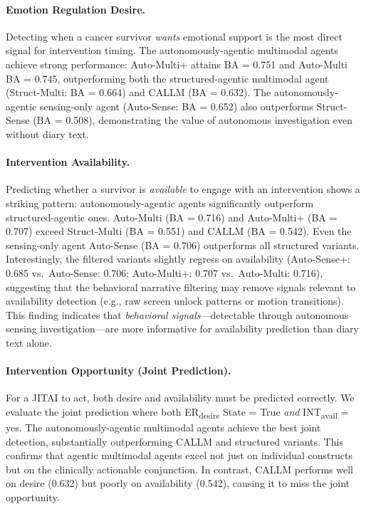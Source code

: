 \documentclass[screen,review,anonymous]{acmart}
\newcommand{\erdesire}{ER\textsubscript{desire}}
\newcommand{\intavail}{INT\textsubscript{avail}}
\begin{document}


\paragraph{Emotion Regulation Desire.}
Detecting when a cancer survivor \emph{wants} emotional support is the most direct signal for intervention timing. The autonomously-agentic multimodal agents achieve strong performance: Auto-Multi+ attains BA = 0.751 and Auto-Multi BA = 0.745, outperforming both the structured-agentic multimodal agent (Struct-Multi: BA = 0.664) and CALLM (BA = 0.632). The autonomously-agentic sensing-only agent (Auto-Sense: BA = 0.652) also outperforms Struct-Sense (BA = 0.508), demonstrating the value of autonomous investigation even without diary text.

\paragraph{Intervention Availability.}
Predicting whether a survivor is \emph{available} to engage with an intervention shows a striking pattern: autonomously-agentic agents significantly outperform structured-agentic ones. Auto-Multi (BA = 0.716) and Auto-Multi+ (BA = 0.707) exceed Struct-Multi (BA = 0.551) and CALLM (BA = 0.542). Even the sensing-only agent Auto-Sense (BA = 0.706) outperforms all structured variants. Interestingly, the filtered variants slightly regress on availability (Auto-Sense+: 0.685 vs.\ Auto-Sense: 0.706; Auto-Multi+: 0.707 vs.\ Auto-Multi: 0.716), suggesting that the behavioral narrative filtering may remove signals relevant to availability detection (e.g., raw screen unlock patterns or motion transitions). This finding indicates that \emph{behavioral signals}---detectable through autonomous sensing investigation---are more informative for availability prediction than diary text alone.

\paragraph{Intervention Opportunity (Joint Prediction).}
For a JITAI to act, both desire and availability must be predicted correctly. We evaluate the joint prediction where both \erdesire{} State = True \emph{and} \intavail{} = yes. The autonomously-agentic multimodal agents achieve the best joint detection, substantially outperforming CALLM and structured variants. This confirms that agentic multimodal agents excel not just on individual constructs but on the clinically actionable conjunction. In contrast, CALLM performs well on desire (0.632) but poorly on availability (0.542), causing it to miss the joint opportunity.
\end{document}
